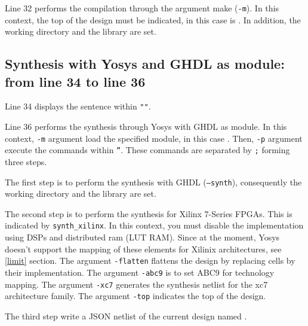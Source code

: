 \noindent Line 32 performs the compilation through the argument make (\texttt{-m}). 
In this context, the top of the design must be indicated, in this case is .
In addition, the working directory and the library  are set.

\subsection{Synthesis with Yosys and GHDL as module: from line 34 to line 36}

Line 34 displays the sentence within \texttt{""}.

\vspace{5mm} 

\noindent Line 36 performs the synthesis through Yosys with GHDL as module. In this context, \texttt{-m} argument load the specified  module, in this case . 
Then, \texttt{-p} argument execute the commands within \texttt{''}.
These commands are separated by \texttt{;} forming three steps. 

\vspace{5mm} 

\noindent The first step is to perform the synthesis with GHDL (\texttt{--synth}), consequently the working directory and the library  are set.

\vspace{5mm} 

\noindent The second step is to perform the synthesis for Xilinx 7-Series FPGAs. This is indicated by \texttt{synth_xilinx}. 
In this context, you must disable the implementation using DSPs and distributed ram (LUT RAM).
Since at the moment, Yosys doesn't support the mapping of these elements for Xilinix architectures, see \ref{limit} section. 
The argument \texttt{-flatten} flattens the design by replacing cells by their implementation. The argument \texttt{-abc9} is to set ABC9 for technology mapping. 
The argument \texttt{-xc7} generates the synthesis netlist for the xc7 architecture family.
The argument \texttt{-top} indicates the top of the design.

\vspace{5mm} 

\noindent The third step write a JSON netlist of the current design named .

